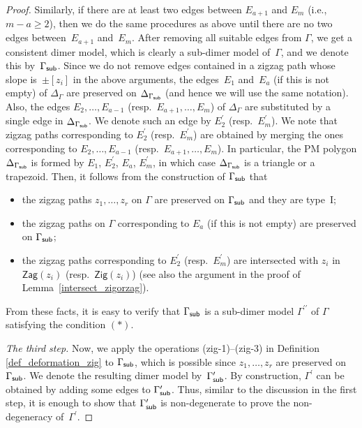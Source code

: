 \documentclass[11pt]{article}
\numberwithin{equation}{section}
\numberwithin{equation}{section}
\numberwithin{figure}{section}
\numberwithin{table}{section}
\newcommand{\Zig}{\mathsf{Zig}}
\newcommand{\Zag}{\mathsf{Zag}}
\begin{document}
\begin{proof}
Similarly, if there are at least two edges between $E_{a+1}$ and $E_m$ (i.e., $m-a \geq 2$), then we do the same procedures as above until there are no two edges between~$E_{a+1}$ and~$E_m$.
After removing all suitable edges from $\Gamma$, we get a consistent dimer model, which is clearly a sub-dimer model of~$\Gamma$,
and we denote this by~$\Gamma_{\sf sub}$.
Since we do not remove edges contained in a zigzag path whose slope is~$\pm[z_i]$ in the above arguments,
the edges~$E_1$ and~$E_a$ (if this is not empty) of $\Delta_\Gamma$ are preserved on $\Delta_{\Gamma_{\sf sub}}$ (and hence we will use the same notation).
Also, the edges $E_2,\dots,E_{a-1}$ (resp.~$E_{a+1},\dots,E_m$) of $\Delta_\Gamma$ are substituted by a single edge in $\Delta_{\Gamma_{\sf sub}}$.
We denote such an edge by $E_2^\prime$ (resp.~$E_m^\prime$).
We note that zigzag paths corresponding to $E_2^\prime$ (resp.~$E_m^\prime$) are obtained by merging the ones corresponding to $E_2,\dots,E_{a-1}$ (resp.~$E_{a+1},\dots,E_m$).
In particular, the PM polygon $\Delta_{\Gamma_{\sf sub}}$ is formed by $E_1$, $E_2^\prime$, $E_a$, $E_m^\prime$, in which case $\Delta_{\Gamma_{\sf sub}}$ is a triangle or a trapezoid.
Then, it follows from the construction of $\Gamma_{\sf sub}$ that
\begin{itemize}\itemsep=0pt
\item[--] the zigzag paths $z_1,\dots,z_r$ on $\Gamma$ are preserved on $\Gamma_{\sf sub}$ and they are type~I;
\item[--] the zigzag paths on $\Gamma$ corresponding to $E_a$ (if this is not empty) are preserved on $\Gamma_{\sf sub}$;
\item[--] the zigzag paths corresponding to $E_2^\prime$ (resp.~$E_m^\prime$) are intersected with $z_i$ in $\Zag(z_i)$ (resp.\ $\Zig(z_i)$)
(see also the argument in the proof of Lemma~\ref{intersect_zigorzag}).
\end{itemize}
From these facts, it is easy to verify that $\Gamma_{\sf sub}$ is a sub-dimer model $\Gamma^{\prime\prime}$ of $\Gamma$ satisfying the condition $(*)$.

{\it The third step.}
Now, we apply the operations (zig-1)--(zig-3) in Definition \ref{def_deformation_zig} to $\Gamma_{\sf sub}$,
which is possible since $z_1,\dots,z_r$ are preserved on~$\Gamma_{\sf sub}$.
We denote the resulting dimer model by~$\Gamma^\prime_{\sf sub}$.
By construction, $\Gamma^\prime$ can be obtained by adding some edges to $\Gamma^\prime_{\sf sub}$. Thus, similar to the discussion in the first step, it is enough to show that $\Gamma^\prime_{\sf sub}$ is non-degenerate to prove the non-degeneracy of~$\Gamma^\prime$.


\end{proof}
\end{document}
